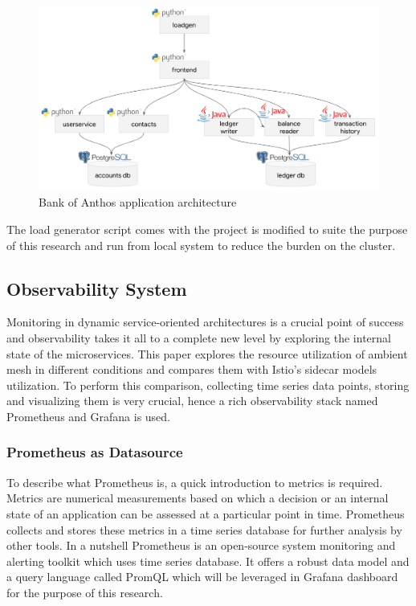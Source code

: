 \begin{figure}[ht!]
    \centering
    \includegraphics[width=1.0\linewidth]{resources/boa-architecture.png}
    \caption{Bank of Anthos application architecture}
    \label{method:boaDesign}
\end{figure}

The load generator script comes with the project is modified to suite the purpose of this research and run from local system to reduce the burden on the cluster.


\subsection{Observability System}
Monitoring in dynamic service-oriented architectures is a crucial point of success and observability takes it all to a complete new level by exploring the internal state of the microservices. This paper explores the resource utilization of ambient mesh in different conditions and compares them with Istio's sidecar models utilization. To perform this comparison, collecting time series data points, storing and visualizing them is very crucial, hence a rich observability stack named Prometheus and Grafana is used.

\subsubsection{Prometheus as Datasource}
To describe what Prometheus is, a quick introduction to metrics is required. Metrics are numerical measurements based on which a decision or an internal state of an application can be assessed at a particular point in time. Prometheus collects and stores these metrics in a time series database for further analysis by other tools. In a nutshell Prometheus is an open-source system monitoring and alerting toolkit which uses time series database. It offers a robust data model and a query language called PromQL which will be leveraged in Grafana dashboard for the purpose of this research.

